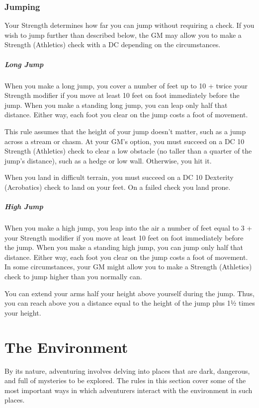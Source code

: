 \subsubsection{Jumping}

Your Strength determines how far you can jump without requiring a check. If you wish to jump further than described below, the GM may allow you to make a Strength (Athletics) check with a DC depending on the circumstances.

\subparagraph*{Long Jump} When you make a long jump, you cover a number of feet up to 10 + twice your Strength modifier if you move at least 10 feet on foot immediately before the jump. When you make a standing long jump, you can leap only half that distance. Either way, each foot you clear on the jump costs a foot of movement.

This rule assumes that the height of your jump doesn't matter, such as a jump across a stream or chasm. At your GM's option, you must succeed on a DC 10 Strength (Athletics) check to clear a low obstacle (no taller than a quarter of the jump's distance), such as a hedge or low wall. Otherwise, you hit it.

When you land in difficult terrain, you must succeed on a DC 10 Dexterity (Acrobatics) check to land on your feet. On a failed check you land prone.

\subparagraph*{High Jump} When you make a high jump, you leap into the air a number of feet equal to 3 + your Strength modifier if you move at least 10 feet on foot immediately before the jump. When you make a standing high jump, you can jump only half that distance. Either way, each foot you clear on the jump costs a foot of movement. In some circumstances, your GM might allow you to make a Strength (Athletics) check to jump higher than you normally can.

You can extend your arms half your height above yourself during the jump. Thus, you can reach above you a distance equal to the height of the jump plus 1½ times your height.

\section{The Environment}

By its nature, adventuring involves delving into places that are dark, dangerous, and full of mysteries to be explored. The rules in this section cover some of the most important ways in which adventurers interact with the environment in such places.

